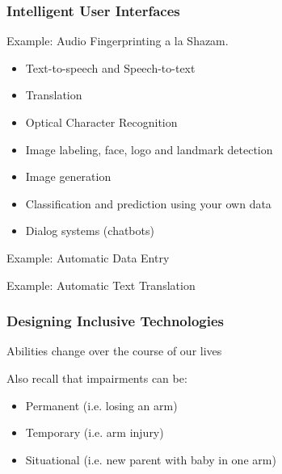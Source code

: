 \subsubsection{Intelligent User Interfaces}
Example: Audio Fingerprinting a la Shazam.
\begin{itemize}
    \item Text-to-speech and Speech-to-text
    \item Translation
    \item Optical Character Recognition
    \item Image labeling, face, logo and landmark detection
    \item Image generation
    \item Classification and prediction using your own data
    \item Dialog systems (chatbots)
\end{itemize}
Example: Automatic Data Entry

Example: Automatic Text Translation

\subsubsection{Designing Inclusive Technologies}
\begin{shaded}
Abilities change over the course of our lives
\end{shaded}
Also recall that impairments can be:
\begin{itemize}
    \item Permanent (i.e. losing an arm)
    \item Temporary (i.e. arm injury)
    \item Situational (i.e. new parent with baby in one arm)
\end{itemize}
